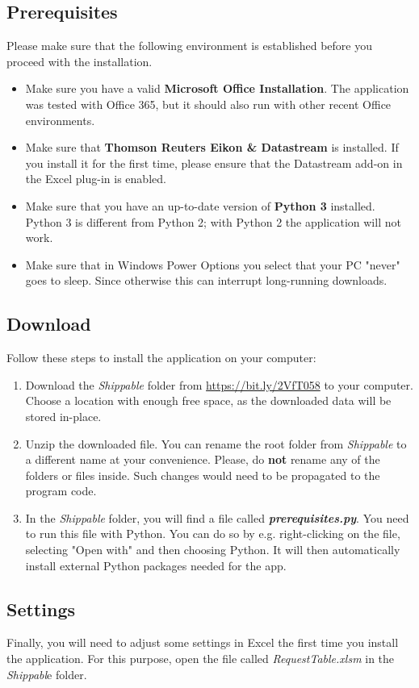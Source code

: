 \subsection{Prerequisites}
Please make sure that the following environment is established before you proceed with the installation.
\begin{itemize}
	\item Make sure you have a valid \textbf{Microsoft Office Installation}. The application was tested with Office 365, but it should also run with other recent Office environments.
	\item Make sure that \textbf{Thomson Reuters Eikon \& Datastream} is installed. If you install it for the first time, please ensure that the Datastream add-on in the Excel plug-in is enabled. 
	\item Make sure that you have an up-to-date version of \textbf{Python 3} installed. Python 3 is different from Python 2; with Python 2 the application will not work. 
	\item Make sure that in Windows Power Options you select that your PC "never" goes to sleep. Since otherwise this can interrupt long-running downloads. 
\end{itemize}

\subsection{Download}
Follow these steps to install the application on your computer: 
\begin{enumerate}
	\item Download the \textit{Shippable} folder from \url{https://bit.ly/2VfT058} to your computer. Choose a location with enough free space, as the downloaded data will be stored in-place. 
	\item Unzip the downloaded file. You can rename the root folder from \textit{Shippable} to a different name at your convenience. Please, do \textbf{not} rename any of the folders or files inside. Such changes would need to be propagated to the program code. 
	\item In the \textit{Shippable }folder, you will find a file called \textbf{\textit{prerequisites.py}}. You need to run this file with Python. You can do so by e.g. right-clicking on the file, selecting "Open with" and then choosing Python. It will then automatically install external Python packages needed for the app. 
\end{enumerate}

\subsection{Settings}
Finally, you will need to adjust some settings in Excel the first time you install the application. For this purpose, open the file called \textit{RequestTable.xlsm} in the \textit{Shippabl}e folder. 

